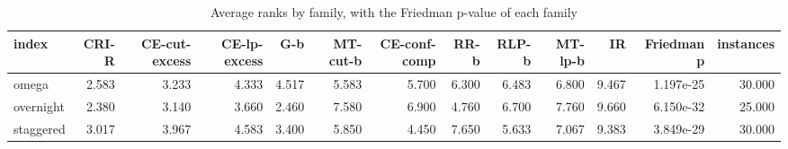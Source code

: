 \begin{table}[htbp]
\centering
\small
\caption{Average ranks by family, with the Friedman p-value of each family}
\label{tab:E2b_head_to_head_budgets_b10_ranks_by_family}
\begin{tabular}{lrrrrrrrrrrrr}
\toprule
index & CRI-R & CE-cut-excess & CE-lp-excess & G-b & MT-cut-b & CE-conf-comp & RR-b & RLP-b & MT-lp-b & IR & Friedman p & instances \\
\midrule
omega & 2.583 & 3.233 & 4.333 & 4.517 & 5.583 & 5.700 & 6.300 & 6.483 & 6.800 & 9.467 & 1.197e-25 & 30.000 \\
overnight & 2.380 & 3.140 & 3.660 & 2.460 & 7.580 & 6.900 & 4.760 & 6.700 & 7.760 & 9.660 & 6.150e-32 & 25.000 \\
staggered & 3.017 & 3.967 & 4.583 & 3.400 & 5.850 & 4.450 & 7.650 & 5.633 & 7.067 & 9.383 & 3.849e-29 & 30.000 \\
\bottomrule
\end{tabular}
\end{table}

